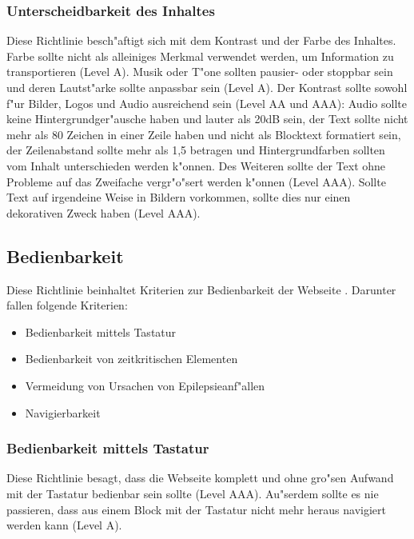 \documentclass[a4paper,bibtotoc,oneside]{scrbook}
\begin{document}
\subsubsection{Unterscheidbarkeit des Inhaltes}
Diese Richtlinie besch"aftigt sich mit dem Kontrast und der Farbe des Inhaltes. Farbe sollte nicht als alleiniges Merkmal verwendet werden, um Information zu transportieren (Level A). Musik oder T"one sollten pausier- oder stoppbar sein und deren Lautst"arke sollte anpassbar sein (Level A). Der Kontrast sollte sowohl f"ur Bilder, Logos und Audio ausreichend sein (Level AA und AAA): Audio sollte keine Hintergrundger"ausche haben und lauter als 20dB sein, der Text sollte nicht mehr als 80 Zeichen in einer Zeile haben und nicht als Blocktext formatiert sein, der Zeilenabstand sollte mehr als 1,5 betragen und Hintergrundfarben sollten vom Inhalt unterschieden werden k"onnen. Des Weiteren sollte der Text ohne Probleme auf das Zweifache vergr"o"sert werden k"onnen (Level AAA). Sollte Text auf irgendeine Weise in Bildern vorkommen, sollte dies nur einen dekorativen Zweck haben (Level AAA). \cite[Abschnitt 1.4]{wcag2}



\subsection{Bedienbarkeit}
Diese Richtlinie beinhaltet Kriterien zur Bedienbarkeit der Webseite \cite[Abschnitt 2]{wcag2}. Darunter fallen folgende Kriterien: 

\begin{itemize}
\item Bedienbarkeit mittels Tastatur \cite[Abschnitt 2.1]{wcag2}
\item Bedienbarkeit von zeitkritischen Elementen \cite[Abschnitt 2.2]{wcag2}
\item Vermeidung von Ursachen von Epilepsieanf"allen \cite[Abschnitt 2.3]{wcag2}
\item Navigierbarkeit \cite[Abschnitt 2.4]{wcag2}
\end{itemize}

\subsubsection{Bedienbarkeit mittels Tastatur}
Diese Richtlinie besagt, dass die Webseite komplett und ohne gro"sen Aufwand mit der Tastatur bedienbar sein sollte (Level AAA). Au"serdem sollte es nie passieren, dass aus einem Block mit der Tastatur nicht mehr heraus navigiert werden kann (Level A). \cite[Abschnitt 2.1]{wcag2}
\end{document}
